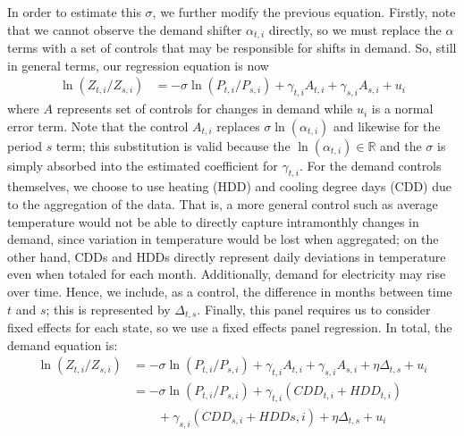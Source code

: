 \documentclass[11pt,a4paper]{extarticle}
\begin{document}
In order to estimate this $\sigma$, we further modify the previous equation. 
Firstly, note that we cannot observe the demand shifter $\alpha_{t,i}$ directly, so we must replace the $\alpha$ terms with a set of controls that may be responsible for shifts in demand. So, still in general terms, our regression equation is now
\begin{align*}
\ln (Z_{t, i} / Z_{ s, i}) &= -\sigma \ln (P_{t,i} / P_{s,i}) +  \gamma_{t,i} A_{t,i} + \gamma_{s,i} A_{s,i} + u_i
\end{align*}
where $A$ represents set of controls for changes in demand while $u_i$ is a normal error term. Note that the control  $A_{t,i}$ replaces $\sigma \ln(\alpha_{t,i})$ and likewise for the period $s$ term; this substitution is valid because the $\ln(\alpha_{t,i}) \in \mathbb{R}$ and the $\sigma$ is simply absorbed into the estimated coefficient for $\gamma_{t,i}$. For the demand controls themselves, we choose to use heating (HDD) and cooling degree days (CDD) due to the aggregation of the data. That is, a more general control such as average temperature would not be able to directly capture intramonthly changes in demand, since variation in temperature would be lost when aggregated; on the other hand, CDDs and HDDs directly represent daily deviations in temperature even when totaled for each month. Additionally, demand for electricity may rise over time. Hence, we include, as a control, the difference in months between time $t$ and $s$; this is represented by $\Delta_{t,s}$. Finally, this panel requires us to consider fixed effects for each state, so we use a fixed effects panel regression. In total, the demand equation is:
\begin{align*}
\ln (Z_{ t, i} / Z_{ s, i}) &= -\sigma \ln (P_{t,i} / P_{s,i}) +  \gamma_{t,i} A_{t,i} + \gamma_{s,i} A_{s,i} + \eta \Delta_{t,s} + u_i \\
&= -\sigma \ln (P_{t,i} / P_{s,i}) +  \gamma_{t,i} \left( CDD_{t,i} + HDD_{t,i} \right) \\
&\qquad + \gamma_{s,i} \left( CDD_{s,i} + HDD{s,i} \right)  + \eta \Delta_{t,s} + u_i
\end{align*}
\end{document}

